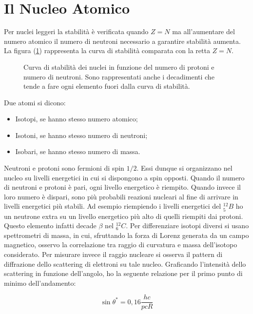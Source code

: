 \documentclass [a4paper, twoside] {book}
\begin{document}
\section{Il Nucleo Atomico}

Per nuclei leggeri la stabilità è verificata quando $Z=N$ ma all'aumentare del numero atomico il numero di neutroni necessario a garantire stabilità aumenta. 
La figura (\ref{curvadistabilita}) rappresenta la curva di stabilità comparata con la retta $Z=N$.\\
\begin{figure} []
\centering
		\caption{Curva di stabilità dei nuclei in funzione del numero di protoni e numero di neutroni. Sono rappresentati anche i decadimenti che tende a fare ogni elemento fuori dalla curva di stabilità.}
         \label{curvadistabilita}
\end{figure}

Due atomi si dicono:

\begin{itemize}
\item Isotopi, se hanno stesso numero atomico;
\item Isotoni, se hanno stesso numero di neutroni;
\item Isobari, se hanno stesso numero di massa.
\end{itemize}

Neutroni e protoni sono fermioni di spin $1/2$. Essi dunque si organizzano nel nucleo su livelli energetici in cui si dispongono a spin opposti.
Quando il numero di neutroni e protoni è pari, ogni livello energetico è riempito. Quando invece il loro numero è dispari, sono più probabili reazioni nucleari al fine di arrivare in livelli energetici più stabili. Ad esempio riempiendo i livelli energetici del $^{12}_5B$ ho un neutrone extra su un livello energetico più alto di quelli riempiti dai protoni. Questo elemento infatti decade $\beta$ nel $^{12}_6C$.
Per differenziare isotopi diversi si usano spettrometri di massa, in cui, sfruttando la forza di Lorenz generata da un campo magnetico, osservo la correlazione tra raggio di curvatura e massa dell'isotopo considerato.
Per misurare invece il raggio nucleare si osserva il pattern di diffrazione dello scattering di elettroni su tale nucleo. Graficando l'intensità dello scattering in funzione dell'angolo, ho la seguente relazione per il primo punto di minimo dell'andamento:

\begin{equation}
\sin \theta^*=0,16\frac{hc}{pcR}
\end{equation}
\end{document}
